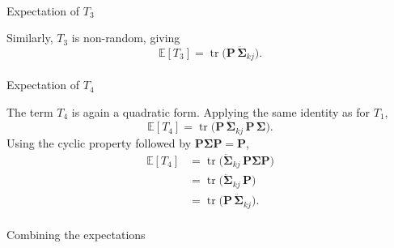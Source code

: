 \documentclass[
  letterpaper,
  DIV=11,
  numbers=noendperiod]{scrartcl}
\makeatletter
\let\oldparagraph\paragraph
\renewcommand{\paragraph}{
    \@ifstar
      \xxxParagraphStar
      \xxxParagraphNoStar
  }
\newcommand{\xxxParagraphStar}[1]{\oldparagraph*{#1}\mbox{}}
\newcommand{\xxxParagraphNoStar}[1]{\oldparagraph{#1}\mbox{}}
\makeatother
\begin{document}
\paragraph{\texorpdfstring{Expectation of
\(T_3\)}{Expectation of T\_3}}\label{expectation-of-t_3}

Similarly, \(T_3\) is non-random, giving \begin{equation}
\mathbb{E}[T_3] = \operatorname{tr}\!\big( \symbf{P}\,\ddot{\symbf{\Sigma}}_{kj} \big).
\end{equation}

\paragraph{\texorpdfstring{Expectation of
\(T_4\)}{Expectation of T\_4}}\label{expectation-of-t_4}

The term \(T_4\) is again a quadratic form. Applying the same identity
as for \(T_1\), \begin{equation}
\mathbb{E}[T_4] = \operatorname{tr}\!\big( \symbf{P}\,\ddot{\symbf{\Sigma}}_{kj}\,\symbf{P} \, \symbf{\Sigma} \big).
\end{equation} Using the cyclic property followed by
\(\symbf{P}\symbf{\Sigma}\symbf{P} = \symbf{P}\), \begin{align}
\mathbb{E}[T_4] &= \operatorname{tr}\!\big( \ddot{\symbf{\Sigma}}_{kj}\,\symbf{P} \symbf{\Sigma} \symbf{P} \big) \\
&= \operatorname{tr}\!\big( \ddot{\symbf{\Sigma}}_{kj}\,\symbf{P} \big) \\
&= \operatorname{tr}\!\big( \symbf{P}\,\ddot{\symbf{\Sigma}}_{kj} \big).
\end{align}

\paragraph{Combining the expectations}\label{combining-the-expectations}
\end{document}
